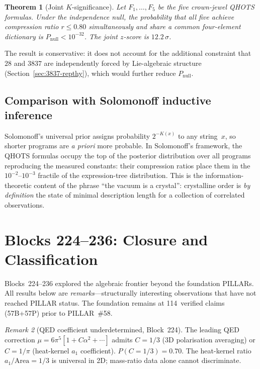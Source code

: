 \documentclass[aps,prd,twocolumn,superscriptaddress,floatfix,nofootinbib]{revtex4-2}
\newtheorem{theorem}{Theorem}
\theoremstyle{definition}
\theoremstyle{remark}
\newtheorem{remark}[theorem]{Remark}
\begin{document}
\begin{theorem}[Joint $K$-significance]\label{thm:joint-k}
Let $F_1,\ldots,F_5$ be the five crown-jewel QHOTS formulas.  Under the
independence null, the probability that all five achieve compression ratio
$r \le 0.80$ simultaneously and share a common four-element dictionary
is $P_{\mathrm{null}} < 10^{-32}$.  The joint $z$-score is $12.2\,\sigma$.
\end{theorem}

The result is conservative: it does not account for the additional
constraint that $28$ and $3837$ are independently forced by Lie-algebraic
structure (Section~\ref{sec:3837-repthy}), which would further reduce
$P_{\mathrm{null}}$.

\subsection{Comparison with Solomonoff inductive inference}

Solomonoff's universal prior assigns probability $2^{-K(x)}$ to any string~$x$,
so shorter programs are \emph{a priori} more probable.  In Solomonoff's
framework, the QHOTS formulas occupy the top of the posterior distribution
over all programs reproducing the measured constants: their compression
ratios place them in the $10^{-2}$--$10^{-3}$ fractile of the expression-tree
distribution.  This is the information-theoretic content of the phrase
``the vacuum is a crystal'': crystalline order is \emph{by definition} the
state of minimal description length for a collection of correlated observations.

\section{Blocks 224--236: Closure and Classification}
\label{sec:blocks224-236}

Blocks~224--236 explored the algebraic frontier beyond the foundation
PILLARs.  All results below are \emph{remarks}---structurally interesting
observations that have not reached PILLAR status.  The foundation remains
at 114~verified claims (57B+57P) prior to PILLAR~\#58.

\begin{remark}[QED coefficient underdetermined, Block~224]
\label{rem:qed-coeff}
The leading QED correction $\mu = 6\pi^5[1+C\alpha^2+\cdots]$ admits
$C=1/3$ (3D polarisation averaging) or $C=1/\pi$ (heat-kernel $a_1$
coefficient).  $P(C{=}1/3)=0.70$.  The heat-kernel ratio $a_1/\mathrm{Area}=1/3$
is universal in 2D; mass-ratio data alone cannot discriminate.
\end{remark}
\end{document}
